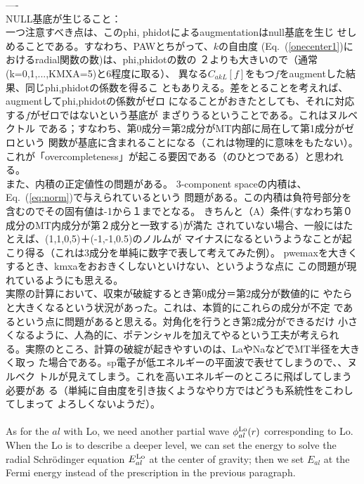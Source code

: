 \documentclass[a4paper,10pt,aip,onecolumn,amsmath,amssymb,floatfix,rmp]{revtex4-1}
\newcommand{\req}[1]{\mbox{Eq.~\!(\ref{#1})}}
\def\CakL{C_{akL}}
\begin{document}
----\\
NULL基底が生じること：\\
一つ注意すべき点は、このphi, phidotによるaugmentationはnull基底を生じ
せしめることである。すなわち、PAWとちがって、$k$の自由度
(\req{onecenter1}におけるradial関数の数)は、phi,phidotの数の
２よりも大きいので（通常(k=0,1,...,KMXA=5)と6程度に取る）、
異なる$\CakL[f]$をもつ$f$をaugmentした結果、同じphi,phidotの係数を得るこ
ともありえる。差をとることを考えれば、augmentしてphi,phidotの係数がゼロ
になることがおきたとしても、それに対応する$f$がゼロではないという基底が
まざりうるということである。これはヌルベクトル
である；すなわち、第0成分＝第2成分がMT内部に局在して第1成分がゼロという
関数が基底に含まれることになる（これは物理的に意味をもたない）。
これが「overcompleteness」が起こる要因である（のひとつである）と思われる。\\

また、内積の正定値性の問題がある。
3-component spaceの内積は、\req{eq:norm}で与えられているという
問題がある。この内積は負符号部分を含むのでその固有値は-1から１までとなる。
きちんと（A）条件(すなわち第０成分のMT内成分が第２成分と一致する)が満た
されていない場合、一般にはたとえば、(1,1,0,5)＋(-1,-1,0.5)のノルムが
マイナスになるというようなことが起こり得る（これは3成分を単純に数字で表して考えてみた例）。
pwemaxを大きくするとき、kmxaをおおきくしないといけない、というような点に
この問題が現れているようにも思える。\\

実際の計算において、収束が破綻するとき第0成分＝第2成分が数値的に
やたらと大きくなるという状況があった。これは、本質的にこれらの成分が不定
であるという点に問題があると思える。対角化を行うとき第2成分ができるだけ
小さくなるように、人為的に、ポテンシャルを加えてやるという工夫が考えられ
る。実際のところ、計算の破綻が起きやすいのは、LaやNaなどでMT半径を大きく取っ
た場合である。sp電子が低エネルギーの平面波で表せてしまうので、、ヌルベク
トルが見えてしまう。これを高いエネルギーのところに飛ばしてしまう必要があ
る（単純に自由度を引き抜くようなやり方ではどうも系統性をこわしてしまって
よろしくないようだ）。\\

\ \\


As for the $al$ with Lo, we need another partial wave $\phi^{\rm
Lo}_{al}(r)$ corresponding to Lo.  When the Lo is to describe a deeper
level, we can set the energy to solve the radial Schr\"odinger equation
$E^{\rm Lo}_{al}$ at the center of gravity; then we set $E_{al}$ at the
Fermi energy instead of the prescription in the previous paragraph.
\end{document}
